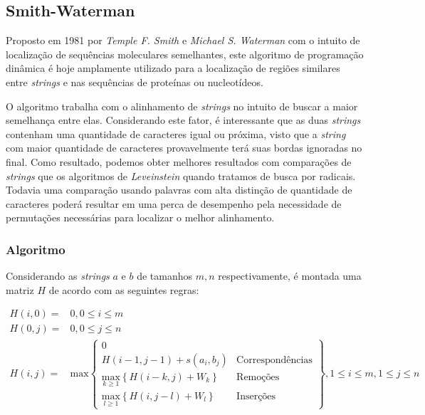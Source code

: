 \subsection{Smith-Waterman} %
\label{sec:smith_waterman}


Proposto em 1981 por \textit{Temple F. Smith} e \textit{Michael S. Waterman}\cite{smith1981identification} com o intuito de localização de sequências moleculares semelhantes, este algoritmo de programação dinâmica é hoje amplamente utilizado para a localização de regiões similares entre \textit{strings} e nas sequências de proteínas ou nucleotídeos.

O algoritmo trabalha com o alinhamento de \textit{strings} no intuito de  buscar a maior semelhança entre elas. Considerando este fator, é interessante que as duas \textit{strings} contenham uma quantidade de caracteres igual ou próxima, visto que  a \textit{string} com  maior quantidade de caracteres provavelmente terá suas bordas ignoradas no final. Como resultado, podemos obter melhores resultados com comparações de \textit{strings} que os algoritmos de \textit{Leveinstein} quando tratamos de busca por radicais. Todavia uma comparação usando palavras com alta distinção de quantidade de caracteres poderá resultar em uma perca de desempenho pela necessidade de permutações necessárias para localizar o melhor alinhamento.

\subsubsection{Algoritmo} %
\label{sub:algoritmo}

Considerando as \textit{strings} $a$ e $b$ de tamanhos $m,n$ respectivamente, é montada uma matriz $H$ de acordo com as seguintes regras:

\begin{align*}
	H(i,0) =& 0, 0 \leq i \leq m \\
	H(0,j) =& 0, 0 \leq j \leq n \\
	H(i,j) =& \text{max}
	\begin{Bmatrix}
		0  &\\
		H(i-1,j-1) + s(a_i,b_j) & \text{Correspondências}\\
		\underset{k\geq1}{\text{max}} \left\{H(i-k,j) + W_k\right\} & \text{Remoções}\\
		\underset{l\geq1}{\text{max}} \left\{H(i,j-l) + W_l\right\} & \text{Inserções}
	\end{Bmatrix}, 1 \leq i \leq m, 1 \leq j \leq n
\end{align*}

